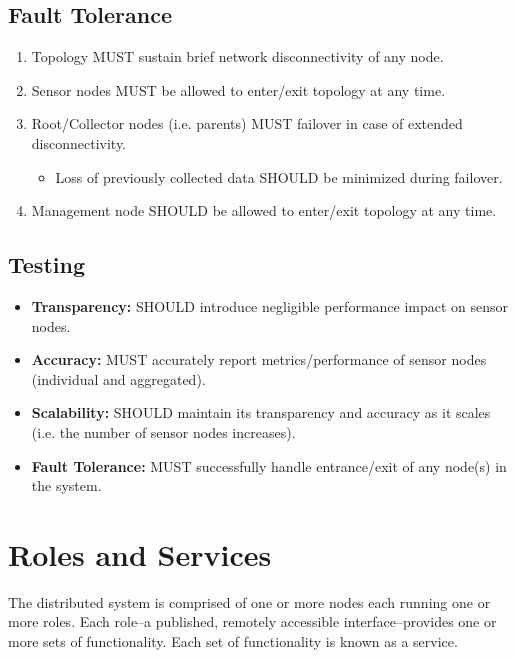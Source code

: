 \subsection{Fault Tolerance}

\begin{enumerate}

\item Topology MUST sustain brief network disconnectivity of any node.
\item Sensor nodes MUST be allowed to enter/exit topology at any time.
\item Root/Collector nodes (i.e. parents) MUST failover in case of extended disconnectivity.
      \begin{itemize}
      \item Loss of previously collected data SHOULD be minimized during failover.
      \end{itemize}
\item Management node SHOULD be allowed to enter/exit topology at any time.

\end{enumerate}

\subsection{Testing}

\begin{itemize}

\item \textbf{Transparency:} \dcamp SHOULD introduce negligible performance impact on sensor nodes.
\item \textbf{Accuracy:} \dcamp MUST accurately report metrics/performance of sensor nodes (individual and aggregated).
\item \textbf{Scalability:} \dcamp SHOULD maintain its transparency and accuracy as it scales (i.e. the number of sensor
      nodes increases).
\item \textbf{Fault Tolerance:} \dcamp MUST successfully handle entrance/exit of any node(s) in the system.

\end{itemize}

\section{\dcamp Roles and Services}

The \dcamp distributed system is comprised of one or more nodes each running one or more roles. Each role--a published,
remotely accessible interface--provides one or more sets of functionality. Each set of functionality is known as a
service.

